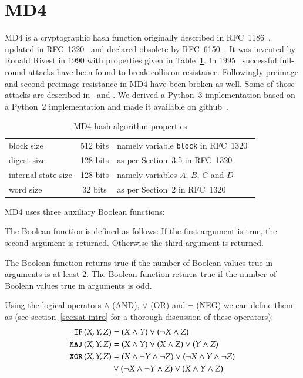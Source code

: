 \section{MD4}
\label{sec:dc-md4}
%
MD4 is a cryptographic hash function originally described in RFC~1186~\cite{rfc1186},
updated in RFC~1320~\cite{rfc1320} and declared obsolete by RFC~6150~\cite{rfc6150}. It was
invented by Ronald Rivest in 1990 with properties given in Table~\ref{tab:md4}.
In 1995~\cite{Dobbertin1998} successful full-round attacks have been found to break collision resistance.
Followingly preimage and second-preimage resistance in MD4 have been broken as well.
Some of those attacks are described in~\cite{md4-2007} and \cite{cryptoeprint:2005:151}.
We derived a Python~3 implementation based on a Python~2 implementation
and made it available on github~\cite{md4-py3k}.
%
\begin{table}[h]
  \begin{center}
    \begin{tabular}{lcl}
      block size           & 512 bits       & namely variable \texttt{block} in RFC~1320~\cite{rfc1320} \\
      digest size          & 128 bits       & as per Section~3.5 in RFC~1320~\cite{rfc1320} \\
      internal state size  & 128 bits       & namely variables $A$, $B$, $C$ and $D$ \\
      word size            & 32 bits        & as per Section~2 in RFC~1320~\cite{rfc1320} \\
    \end{tabular}
    \caption{MD4 hash algorithm properties}
    \label{tab:md4}
  \end{center}
\end{table}

MD4 uses three auxiliary Boolean functions:
\begin{defi}
  The Boolean  function is defined as follows:
  If the first argument is true, the second argument is returned.
  Otherwise
  the third argument is returned.

  The Boolean  function returns true if the number
  of Boolean values true in arguments is at least $2$.
  The Boolean  function returns true if the number
  of Boolean values true in arguments is odd.
\end{defi}

Using the logical operators $\land$ (AND), $\lor$ (OR) and $\neg$ (NEG)
we can define them as (see section~\ref{sec:sat-intro} for a thorough
discussion of these operators):
\begin{align}
  \operatorname{\texttt{IF\,}}(X,Y,Z) &= (X \land Y) \lor (\neg X \land Z) \\
  \operatorname{\texttt{MAJ\,}}(X,Y,Z) &= (X \land Y) \lor (X \land Z) \lor (Y \land Z) \\
  \operatorname{\texttt{XOR\,}}(X,Y,Z) &= (X \land \neg Y \land \neg Z) \lor (\neg X \land Y \land \neg Z) \nonumber\\
              &\lor (\neg X \land \neg Y \land Z) \lor (X \land Y \land Z)
\end{align}


